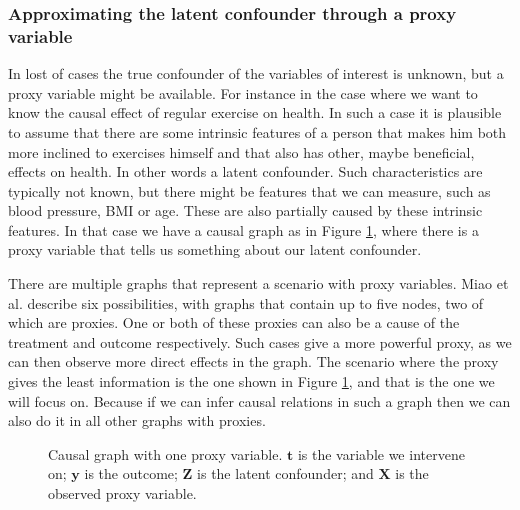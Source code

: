 \documentclass{article}
\newcommand{\bt}{\mathbf{t}}
\newcommand{\bX}{\mathbf{X}}
\newcommand{\by}{\mathbf{y}}
\newcommand{\bZ}{\mathbf{Z}}
\begin{document}



\subsubsection*{Approximating the latent confounder through a proxy variable}
In lost of cases the true confounder of the variables of interest is unknown, but a proxy variable might be available\cite{kuroki2014measurement}\cite{miao2018identifying}. For instance in the case where we want to know the causal effect of regular exercise on health. In such a case it is plausible to assume that there are some intrinsic features of a person that makes him both more inclined to exercises himself and that also has other, maybe beneficial, effects on health. In other words a latent confounder. Such characteristics are typically not known, but there might be features that we can measure, such as blood pressure, BMI or age. These are also partially caused by these intrinsic features. In that case we have a causal graph as in Figure \ref{fig:causal_graph_with_proxy}, where there is a proxy variable that tells us something about our latent confounder.

There are multiple graphs that represent a scenario with proxy variables. Miao et al. describe six possibilities, with graphs that contain up to five nodes, two of which are proxies. One or both of these proxies can also be a cause of the treatment and outcome respectively. Such cases give a more powerful proxy, as we can then observe more direct effects in the graph. The scenario where the proxy gives the least information is the one shown in Figure \ref{fig:causal_graph_with_proxy}, and that is the one we will focus on. Because if we can infer causal relations in such a graph then we can also do it in all other graphs with proxies.


\begin{figure}[b]
    \centering
    
    \caption{Causal graph with one proxy variable. $\bt$ is the variable we intervene on; $\by$ is the outcome; $\bZ$ is the latent confounder; and $\bX$ is the observed proxy variable.}
    \label{fig:causal_graph_with_proxy}
\end{figure}
\end{document}
